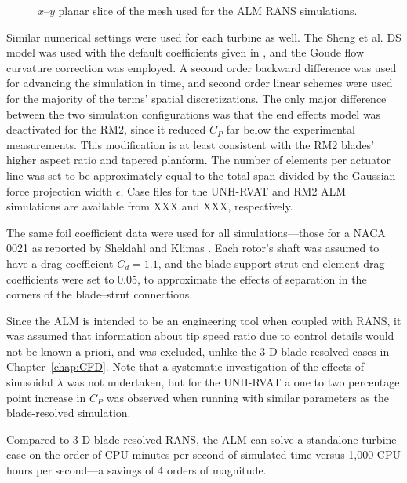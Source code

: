 \begin{figure}
    \centering
    
    \caption{$x$--$y$ planar slice of the mesh used for the ALM RANS
        simulations.}
    
    \label{fig:ALM-mesh}
\end{figure}

Similar numerical settings were used for each turbine as well. The Sheng et al.
DS model was used with the default coefficients given in \cite{Sheng2008}, and
the Goude flow curvature correction was employed. A second order backward
difference was used for advancing the simulation in time, and second order
linear schemes were used for the majority of the terms' spatial discretizations.
The only major difference between the two simulation configurations was that the
end effects model was deactivated for the RM2, since it reduced $C_P$ far below
the experimental measurements. This modification is at least consistent with the
RM2 blades' higher aspect ratio and tapered planform. The number of elements per
actuator line was set to be approximately equal to the total span divided by the
Gaussian force projection width $\epsilon$. Case files for the UNH-RVAT and RM2
ALM simulations are available from XXX and XXX, respectively. 

The same foil coefficient data were used for all simulations---those for a NACA
0021 as reported by Sheldahl and Klimas \cite{Sheldahl1981}. Each rotor's shaft
was assumed to have a drag coefficient $C_d = 1.1$, and the blade support strut
end element drag coefficients were set to 0.05, to approximate the effects of
separation in the corners of the blade--strut connections.

Since the ALM is intended to be an engineering tool when coupled with RANS, it
was assumed that information about tip speed ratio due to control details would
not be known a priori, and was excluded, unlike the 3-D blade-resolved cases in
Chapter~\ref{chap:CFD}. Note that a systematic investigation of the effects of
sinusoidal $\lambda$ was not undertaken, but for the UNH-RVAT a one to two
percentage point increase in $C_P$ was observed when running with similar
parameters as the blade-resolved simulation.

Compared to 3-D blade-resolved RANS, the ALM can solve a standalone turbine case
on the order of CPU minutes per second of simulated time versus 1,000 CPU hours
per second---a savings of 4 orders of magnitude.


